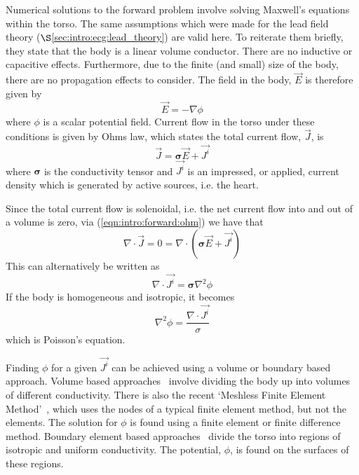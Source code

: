 Numerical solutions to the forward problem involve solving Maxwell's equations
within the torso.
The same assumptions which were made for the lead field theory
($\S$\ref{sec:intro:ecg:lead_theory}) are valid here.
To reiterate them briefly, they state that the body is a linear volume
conductor.
There are no inductive or capacitive effects.
Furthermore, due to the finite (and small) size of the body, there are no
propagation effects to consider.
The field in the body, $\vec{E}$ is therefore given by
\begin{equation}
\label{eqn:intro:forward:maxwell}
\vec{E} = -\nabla\phi
\end{equation}
where $\phi$ is a scalar potential field.
Current flow in the torso under these conditions is given by Ohms law, which
states the total current flow, $\vec{J}$, is
\begin{equation}
\label{eqn:intro:forward:ohm}
\vec{J} = \mathbf{\sigma}\vec{E} + \vec{J^i}
\end{equation}
where $\mathbf{\sigma}$ is the conductivity tensor and $\vec{J^i}$ is an
impressed, or applied, current density which is generated by active sources,
i.e. the heart.

Since the total current flow is solenoidal, i.e. the net current flow into and
out of a volume is zero, via (\ref{eqn:intro:forward:ohm}) we have that
\begin{equation}
\label{eqn:intro:forward:ohm2}
\nabla\cdot\vec{J} = 0 = \nabla\cdot\left(\mathbf{\sigma}\vec{E} + \vec{J^i} \right)
\end{equation}
This can alternatively be written as
\begin{equation}
\label{eqn:intro:forward:poisson}
\nabla\cdot\vec{J^i} = \mathbf{\sigma}\nabla^2\phi
\end{equation}
If the body is homogeneous and isotropic, it becomes
\begin{equation}
\label{eqn:intro:forward:poisson2}
\nabla^2\phi = \frac{\nabla\cdot\vec{J^i}}{\sigma}
\end{equation}
which is Poisson's equation.

Finding $\phi$ for a given $\vec{J^i}$ can be achieved using a volume or
boundary based approach.
Volume based approaches \cite{Seger2004,Klepfer1997,Keller2007}\ involve dividing the body
up into volumes of different conductivity.
There is also the recent `Meshless Finite Element Method'~\cite{Li2007a}, which
uses the nodes of a typical finite element method, but not the elements.
The solution for $\phi$ is found using a finite element or finite difference
method.
Boundary element based approaches
\cite{Barr1966,Clayton2002,Gulrajani1989,Weixue1996}\ divide the torso into
regions of isotropic and uniform conductivity.
The potential, $\phi$, is found on the surfaces of these regions.


